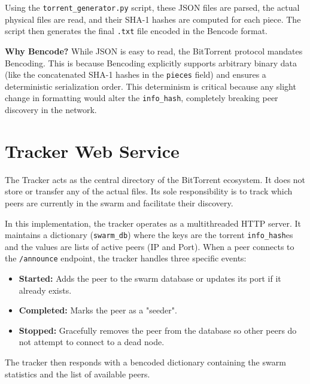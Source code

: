 \documentclass[a4paper,12pt]{article}
\begin{document}
Using the \texttt{torrent\_generator.py} script, these JSON files are parsed, the actual physical files are read, and their SHA-1 hashes are computed for each piece. 
The script then generates the final \texttt{.txt} file encoded in the Bencode format.

\textbf{Why Bencode?} While JSON is easy to read, the BitTorrent protocol mandates Bencoding. This is because Bencoding explicitly supports arbitrary binary data (like the concatenated SHA-1 hashes in the \texttt{pieces} field) 
and ensures a deterministic serialization order. This determinism is critical because any slight change in formatting would alter the \texttt{info\_hash}, completely breaking peer discovery in the network.

\section{Tracker Web Service}
The Tracker acts as the central directory of the BitTorrent ecosystem. 
It does not store or transfer any of the actual files. Its sole responsibility is to track which peers are currently in the swarm and facilitate their discovery.

In this implementation, the tracker operates as a multithreaded HTTP server. 
It maintains a dictionary (\texttt{swarm\_db}) where the keys are the torrent \texttt{info\_hash}es and the values are lists of active peers (IP and Port). When a peer connects to the \texttt{/announce} endpoint, 
the tracker handles three specific events:
\begin{itemize}
    \item \textbf{Started:} Adds the peer to the swarm database or updates its port if it already exists.
    \item \textbf{Completed:} Marks the peer as a "seeder".
    \item \textbf{Stopped:} Gracefully removes the peer from the database so other peers do not attempt to connect to a dead node.
\end{itemize}
The tracker then responds with a bencoded dictionary containing the swarm statistics and the list of available peers.
\end{document}
